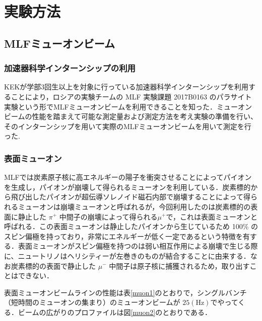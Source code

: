 



%

\section{実験方法}
\subsection{MLFミューオンビーム}
\subsubsection{加速器科学インターンシップの利用}
KEKが学部3回生以上を対象に行っている加速器科学インターンシップを利用することにより，ロシアの実験チームの MLF 実験課題 2017B0163 のパラサイト実験という形でMLFミューオンビームを利用できることを知った．ミューオンビームの性能を踏まえて可能な測定量および測定方法を考え実験の準備を行い、そのインターンシップを用いて実際のMLFミューオンビームを用いて測定を行った.
 \subsubsection{表面ミューオン}
 MLFでは炭素原子核に高エネルギーの陽子を衝突させることによってパイオンを生成し，パイオンが崩壊して得られるミューオンを利用している．炭素標的から飛び出したパイオンが超伝導ソレノイド磁石内部で崩壊することによって得られるミューオンは崩壊ミューオンと呼ばれるが，今回利用したのは炭素標的の表面に静止した $\pi^+$ 中間子の崩壊によって得られる$\mu ^+$で，これは表面ミューオンと呼ばれる．この表面ミューオンは静止したパイオンから生じているため 100\% のスピン偏極を持っており，非常にエネルギーが低く一定であるという特徴を有する．表面ミューオンがスピン偏極を持つのは弱い相互作用による崩壊で生じる際に、ニュートリノはヘリシティーが左巻きのものが結合することに由来する．なお炭素標的の表面で静止した $\mu^-$ 中間子は原子核に捕獲されるため，取り出すことはできない．\par
 表面ミューオンビームラインの性能は表\ref{muon1}のとおりで，シングルバンチ（短時間のミューオンの集まり）のミューオンビームが $25 (\mathrm{Hz})$でやってくる．ビームの広がりのプロファイルは図\ref{muon2}のとおりである．%


